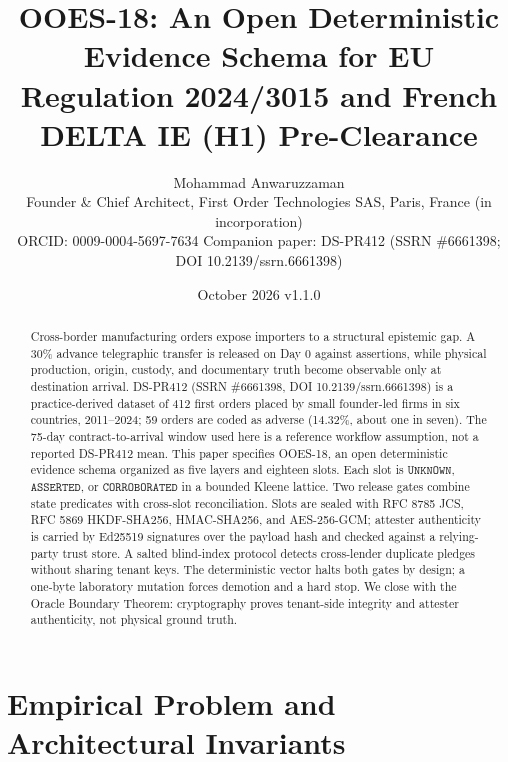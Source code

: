 \documentclass[10pt,twocolumn,a4paper]{article}
\title{\vspace{-1.5em}\large\bfseries OOES-18: An Open Deterministic Evidence Schema for EU Regulation 2024/3015 and French DELTA IE (H1) Pre-Clearance}
\author{%
\small Mohammad Anwaruzzaman\\[-1pt]
\scriptsize Founder \& Chief Architect, First Order Technologies SAS, Paris, France (in incorporation)\\[-1pt]
\scriptsize ORCID: 0009-0004-5697-7634 \quad Companion paper: DS-PR412 (SSRN \#6661398; DOI 10.2139/ssrn.6661398)%
}
\date{\small October 2026 \quad v1.1.0}
\newcommand{\code}[1]{\texttt{\footnotesize\detokenize{#1}}}
\newcommand{\STATE}[1]{\ensuremath{\mathtt{#1}}}
\begin{document}
\maketitle
\thispagestyle{plain}
\small

\begin{abstract}
\small
Cross-border manufacturing orders expose importers to a structural epistemic gap. A 30\% advance telegraphic transfer is released on Day 0 against assertions, while physical production, origin, custody, and documentary truth become observable only at destination arrival. DS-PR412 (SSRN \#6661398, DOI 10.2139/ssrn.6661398) is a practice-derived dataset of 412 first orders placed by small founder-led firms in six countries, 2011--2024; 59 orders are coded as adverse (14.32\%, about one in seven). The 75-day contract-to-arrival window used here is a reference workflow assumption, not a reported DS-PR412 mean. This paper specifies OOES-18, an open deterministic evidence schema organized as five layers and eighteen slots. Each slot is \STATE{UNKNOWN}, \STATE{ASSERTED}, or \STATE{CORROBORATED} in a bounded Kleene lattice. Two release gates combine state predicates with cross-slot reconciliation. Slots are sealed with RFC 8785 JCS, RFC 5869 HKDF-SHA256, HMAC-SHA256, and AES-256-GCM; attester authenticity is carried by Ed25519 signatures over the payload hash and checked against a relying-party trust store. A salted blind-index protocol detects cross-lender duplicate pledges without sharing tenant keys. The deterministic vector \code{CASCADE-2026-9F4A2C} halts both gates by design; a one-byte laboratory mutation forces demotion and a \code{GATE_02} hard stop. We close with the Oracle Boundary Theorem: cryptography proves tenant-side integrity and attester authenticity, not physical ground truth.
\end{abstract}

\section{Empirical Problem and Architectural Invariants}
\end{document}
